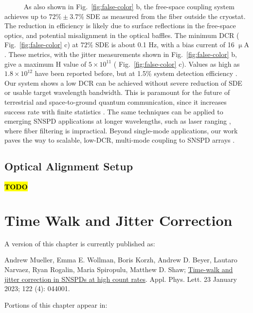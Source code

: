 \documentclass[11pt]{caltech_thesis} %
\begin{document}
~~~~~ As also shown in Fig.~\ref{fig:false-color} b, the free-space coupling system achieves up to $72 \% \pm 3.7 \%$ SDE as measured from the fiber outside the cryostat. The reduction in efficiency is likely due to surface reflections in the free-space optics, and potential misalignment in the optical baffles. The minimum DCR ( Fig.~\ref{fig:false-color} c) at $72 \%$ SDE is about 0.1 Hz, with a bias current of 16 $\mathrm{\upmu A}$. These metrics, with the jitter measurements shown in Fig.~\ref{fig:false-color} b, give a maximum H value of $5 \times 10^{11}$ ( Fig.~\ref{fig:false-color} c). Values as high as $1.8 \times 10^{12}$ have been reported before, but at 1.5\% system detection efficiency \autocite{Shibata2015}. Our system shows a low DCR can be achieved without severe reduction of SDE or usable target wavelength bandwidth. This is paramount for the future of terrestrial and space-to-ground quantum communication, since it increases success rate with finite statistics \autocite{Boaron2018secure}. The same techniques can be applied to emerging SNSPD applications at longer wavelengths, such as laser ranging \autocite{Taylor2019}, where fiber filtering is impractical. Beyond single-mode applications, our work paves the way to scalable, low-DCR, multi-mode coupling to SNSPD arrays \autocite{Wollman2019}.

\hypertarget{optical-alignment-setup}{%
\section{Optical Alignment Setup}\label{optical-alignment-setup}}

\textbf{\hl{TODO}}

\hypertarget{time-walk-and-jitter-correction}{%
\chapter{Time Walk and Jitter Correction}\label{time-walk-and-jitter-correction}}

A version of this chapter is currently published as:

Andrew Mueller, Emma E. Wollman, Boris Korzh, Andrew D. Beyer, Lautaro Narvaez, Ryan Rogalin, Maria Spiropulu, Matthew D. Shaw; \href{https://pubs.aip.org/aip/apl/article/122/4/044001/2870246/Time-walk-and-jitter-correction-in-SNSPDs-at-high}{Time-walk and jitter correction in SNSPDs at high count rates}. Appl. Phys. Lett. 23 January 2023; 122 (4): 044001.

Portions of this chapter appear in:
\end{document}
